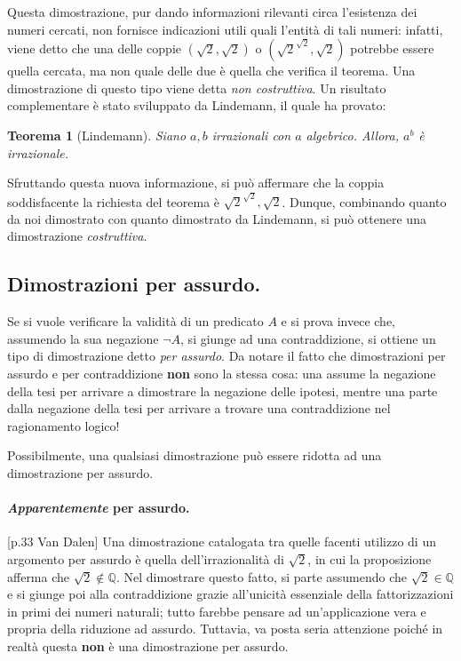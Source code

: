\documentclass[fontsize = 11 pt, paper=A4, oneside, index=totoc, hyperref]{article}
\theoremstyle{definition}
\theoremstyle{plain}
\newtheorem{thm}{Teorema}[section]
\begin{document}
Questa dimostrazione, pur dando informazioni rilevanti circa l'esistenza dei numeri cercati, non fornisce indicazioni utili quali l'entità di tali numeri: infatti, viene detto che una delle coppie \((\sqrt{2},\sqrt{2})\) o \((\sqrt{2}^{\sqrt{2}},\sqrt{2})\) potrebbe essere quella cercata, ma non quale delle due è quella che verifica il teorema. Una dimostrazione di questo tipo viene detta \emph{non costruttiva}. Un risultato complementare è stato sviluppato da Lindemann, il quale ha provato:
\begin{thm}[Lindemann]
  Siano \(a,b\) irrazionali con \(a\) algebrico. Allora, \(a^b\) è irrazionale.
\end{thm}
Sfruttando questa nuova informazione, si può affermare che la coppia soddisfacente la richiesta del teorema è \(\sqrt{2}^{\sqrt{2}}, \sqrt{2}\). Dunque, combinando quanto da noi dimostrato con quanto dimostrato da Lindemann, si può ottenere una dimostrazione \emph{costruttiva}.

\subsection{Dimostrazioni per assurdo.}
Se si vuole verificare la validità di un predicato \(A\) e si prova invece che, assumendo la sua negazione \(\lnot A\), si giunge ad una contraddizione, si ottiene un tipo di dimostrazione detto \emph{per assurdo}. Da notare il fatto che dimostrazioni per assurdo e per contraddizione {\bf non} sono la stessa cosa: una assume la negazione della tesi per arrivare a dimostrare la negazione delle ipotesi, mentre una parte dalla negazione della tesi per arrivare a trovare una contraddizione nel ragionamento logico!

Possibilmente, una qualsiasi dimostrazione può essere ridotta ad una dimostrazione per assurdo.

\paragraph{\emph{Apparentemente} per assurdo.}[p.33 Van Dalen] Una dimostrazione catalogata tra quelle facenti utilizzo di un argomento per assurdo è quella dell'irrazionalità di \(\sqrt{2}\), in cui la proposizione afferma che \(\sqrt{2} \notin \mathbb{Q}\). Nel dimostrare questo fatto, si parte assumendo che \(\sqrt{2} \in \mathbb{Q}\) e si giunge poi alla contraddizione grazie all'unicità essenziale della fattorizzazioni in primi dei numeri naturali; tutto farebbe pensare ad un'applicazione vera e propria della riduzione ad assurdo. Tuttavia, va posta seria attenzione poiché in realtà questa {\bf non} è una dimostrazione per assurdo.
\end{document}
